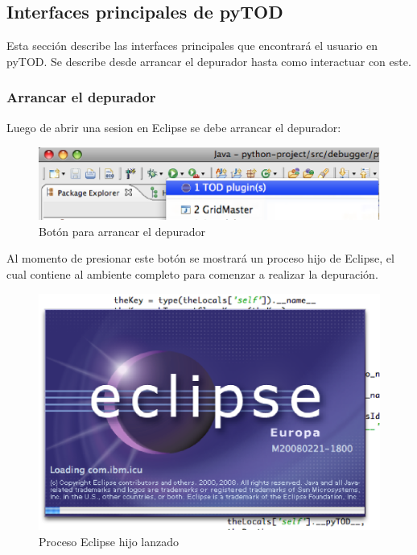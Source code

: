\documentclass[12pt,legalpaper]{report}
\begin{document}
\newpage	
		\subsection{Interfaces principales de pyTOD}
		
Esta sección describe las interfaces principales que encontrará el usuario en pyTOD.  Se describe desde arrancar el depurador hasta como interactuar con este.

			\subsubsection{Arrancar el depurador}	

Luego de abrir una sesion en Eclipse se debe arrancar el depurador:

\begin{figure}[h]
	\centering
	\includegraphics[scale=0.4]{images/interfacesPlugin/arrancarTOD.eps}
	\caption{Botón para arrancar el depurador}
\end{figure}

Al momento de presionar este botón se mostrará un proceso hijo de Eclipse, el cual contiene al ambiente completo para comenzar a realizar la depuración.

\begin{figure}[h]
	\centering
	\includegraphics[scale=0.4]{images/interfacesPlugin/arrancarTOD-2.eps}
	\caption{Proceso Eclipse hijo lanzado}
\end{figure}
\end{document}
